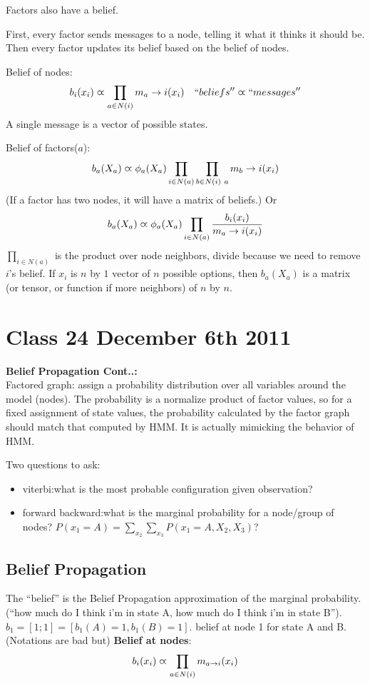 Factors also have a belief. 

First, every factor sends messages to a node, telling it what it
thinks it should be. Then every factor updates its belief based on the
belief of nodes.

Belief of nodes:
$$b_i(x_i)\varpropto \prod_{a\in N(i)}m_a \rightarrow i(x_i) \quad ``beliefs'' \varpropto ``messages''$$
A single message is a vector of possible states.

Belief of factors($a$):
$$b_a(X_a)\varpropto \phi_a(X_a)\prod_{i\in N(a)}\prod_{b\in
  N(i)\ a}m_b\rightarrow i(x_i)$$
(If a factor has two nodes, it will have a matrix of beliefs.)
Or 
$$b_a(X_a)\varpropto \phi_a(X_a)\prod_{i\in N(a)}\frac{b_i(x_i)}{m_a\rightarrow i(x_i)}$$
$\prod_{i \in N(a)}$ is the product over node neighbors, divide
because we need to remove $i$'s belief. If $x_i$ is $n$ by $1$ vector
of $n$ possible options, then $b_a(X_a)$ is a matrix (or tensor, or
function if more neighbors) of $n$ by $n$.
\pagebreak
\section{Class 24 December 6th 2011}
\textbf{Belief Propagation Cont..:}\\

Factored graph: assign a probability distribution over all variables
around the model (nodes). The probability is a normalize product of
factor values, so for a fixed assignment of state values, the probability
calculated by the factor graph should match that computed by HMM. It
is actually mimicking the behavior of HMM.

Two questions to ask:
\begin{itemize}
\item viterbi:what is the most probable configuration given
  observation?
\item forward backward:what is the marginal probability for a node/group
  of nodes? $P(x_1=A)=\sum_{x_2}\sum_{x_3}P(x_1=A, X_2, X_3)$?
\end{itemize}

\subsection{Belief Propagation}

The ``belief'' is the Belief Propagation approximation of the
marginal probability. (``how much do I think i'm in state A, how much do
I think i'm in state B''). $b_1=[1;1] = [b_1(A)=1, b_1(B)=1]$. belief at node 1 for
state A and B.
(Notations are bad but)
\textbf{Belief at nodes}:
$$b_i(x_i) \varpropto \prod_{a\in N(i)}m_{a\rightarrow i}(x_i)$$

